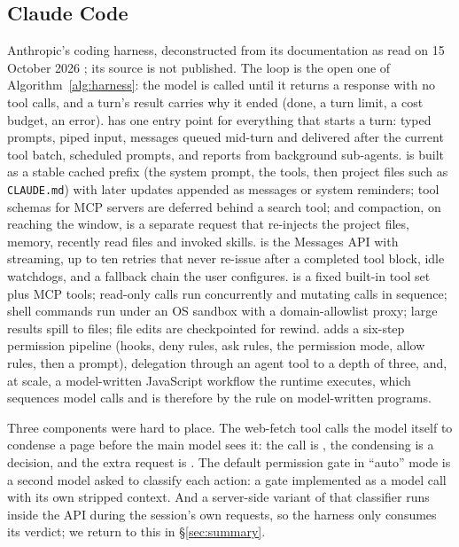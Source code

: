 \subsection{Claude Code}
Anthropic's coding harness, deconstructed from its documentation as read on 15 October 2026 \citep{claudecode}; its source is not published. The loop is the open one of Algorithm~\ref{alg:harness}: the model is called until it returns a response with no tool calls, and a turn's result carries why it ended (done, a turn limit, a cost budget, an error).  has one entry point for everything that starts a turn: typed prompts, piped input, messages queued mid-turn and delivered after the current tool batch, scheduled prompts, and reports from background sub-agents.  is built as a stable cached prefix (the system prompt, the tools, then project files such as \texttt{CLAUDE.md}) with later updates appended as messages or system reminders; tool schemas for MCP servers are deferred behind a search tool; and compaction, on reaching the window, is a separate request that re-injects the project files, memory, recently read files and invoked skills.  is the Messages API with streaming, up to ten retries that never re-issue after a completed tool block, idle watchdogs, and a fallback chain the user configures.  is a fixed built-in tool set plus MCP tools; read-only calls run concurrently and mutating calls in sequence; shell commands run under an OS sandbox with a domain-allowlist proxy; large results spill to files; file edits are checkpointed for rewind.  adds a six-step permission pipeline (hooks, deny rules, ask rules, the permission mode, allow rules, then a prompt), delegation through an agent tool to a depth of three, and, at scale, a model-written JavaScript workflow the runtime executes, which sequences model calls and is therefore  by the rule on model-written programs.

Three components were hard to place. The web-fetch tool calls the model itself to condense a page before the main model sees it: the call is , the condensing is a  decision, and the extra request is . The default permission gate in ``auto'' mode is a second model asked to classify each action: a  gate implemented as a model call with its own stripped context. And a server-side variant of that classifier runs inside the API during the session's own requests, so the harness only consumes its verdict; we return to this in \S\ref{sec:summary}.

